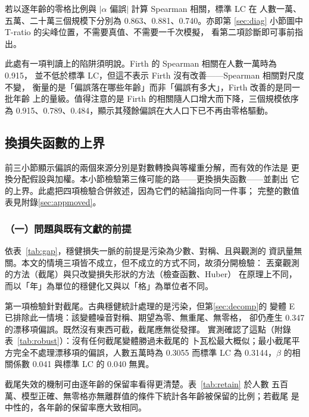 \documentclass[UTF8, fontset=macnew, a4paper, 12pt]{ctexart}
\begin{document}
若以逐年齡的零格比例與 $|\alpha$ 偏誤$|$ 計算 Spearman 相關，標準 LC 在
人數一萬、五萬、二十萬三個規模下分別為 0.863、0.881、0.740。亦即第
\ref{sec:diag} 小節圖中 T-ratio 的尖峰位置，不需要真值、不需要一千次模擬，
看第二項診斷即可事前指出。

此處有一項判讀上的陷阱須明說。Firth 的 Spearman 相關在人數一萬時為 0.915，
並不低於標準 LC，但這不表示 Firth 沒有改善——Spearman 相關對尺度不變，
衡量的是「偏誤落在哪些年齡」而非「偏誤有多大」，Firth 改善的是同一批年齡
上的量級。值得注意的是 Firth 的相關隨人口增大而下降，三個規模依序為
0.915、0.789、0.484，顯示其殘餘偏誤在大人口下已不再由零格驅動。

\subsection{換損失函數的上界}\label{sec:qlc}\label{sec:mq}\label{sec:hu}

前三小節顯示偏誤的兩個來源分別是對數轉換與等權重分解，而有效的作法是
更換分配假設與加權。本小節檢驗第三條可能的路——更換損失函數——並劃出
它的上界。此處把四項檢驗合併敘述，因為它們的結論指向同一件事；
完整的數值表見附錄\ref{sec:appmoved}。

\subsubsection{（一）問題與既有文獻的前提}

依表~\ref{tab:gap}，穩健損失一脈的前提是污染為少數、對稱、且與觀測的
資訊量無關。本文的情境三項皆不成立，但不成立的方式不同，故須分開檢驗：
丟棄觀測的方法（截尾）與只改變損失形狀的方法（檢查函數、Huber）
在原理上不同，而以「年」為單位的穩健化又與以「格」為單位者不同。

第一項檢驗針對截尾。古典穩健統計處理的是污染，但第\ref{sec:decomp}的
變體 E 已排除此一情境：該變體噪音對稱、期望為零、無重尾、無零格，
卻仍產生 0.347 的漂移項偏誤。既然沒有東西可截，截尾應無從發揮。
實測確認了這點（附錄表~\ref{tab:robust}）：沒有任何截尾變體勝過未截尾的
卜瓦松最大概似；最小截尾平方完全不處理漂移項的偏誤，人數五萬時為 0.3055
而標準 LC 為 0.3144，$\beta$ 的相關係數 0.041 與標準 LC 的 0.040 無異。


截尾失效的機制可由逐年齡的保留率看得更清楚。表~\ref{tab:retain} 於人數
五百萬、模型正確、無零格亦無離群值的條件下統計各年齡被保留的比例；若截尾
是中性的，各年齡的保留率應大致相同。
\end{document}
